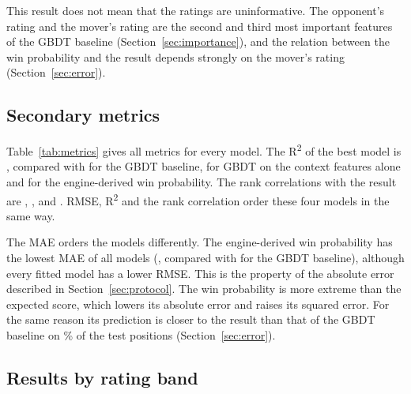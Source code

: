 \documentclass[11pt]{article}
\begin{document}
This result does not mean that the ratings are uninformative. The
opponent's rating and the mover's rating are the second and third most
important features of the GBDT baseline
(Section~\ref{sec:importance})\iflook, and the relation between the win
probability and the result depends strongly on the mover's rating
(Section~\ref{sec:error})\fi.

\subsection{Secondary metrics}

Table~\ref{tab:metrics} gives all metrics for every model. The
R\textsuperscript{2} of the best model is , compared with
 for the GBDT baseline,  for GBDT on
the context features alone and  for the engine-derived
win probability. The rank correlations with the result are ,
,  and
. RMSE, R\textsuperscript{2} and the rank
correlation order these four models in the same way.

\begin{table}[htbp]\centering\small
{}
\caption{All metrics for every model on the test set. RMSE and MAE are errors
of the predicted score and lower is better. The models are ranked by RMSE;
the MAE favours extreme predictions (Section~\ref{sec:protocol}). For
R\textsuperscript{2} and Spearman's rank correlation higher is better. The
constant baseline predicts a single value and has no rank correlation.}
\label{tab:metrics}
\end{table}

The MAE orders the models differently. The engine-derived win probability has
the lowest MAE of all models (, compared with
 for the GBDT baseline), although every fitted model has a
lower RMSE. This is the property of the absolute error described in
Section~\ref{sec:protocol}. The win probability is more extreme than the
expected score, which lowers its absolute error and raises its squared
error.\iflook{} For the same reason its prediction is closer to the result
than that of the GBDT baseline on \% of the
test positions (Section~\ref{sec:error}).\fi

\subsection{Results by rating band}
\end{document}
